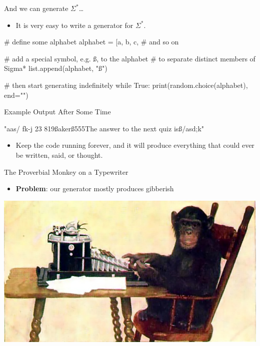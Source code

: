 \documentclass[professionalfonts, xcolor={usenames,svgnames,x11names,table}]{beamer}
\begin{document}
\begin{frame}[fragile]{And we can generate $\Sigma^*$\ldots}
    \begin{itemize}
        \item It is very easy to write a generator for $\Sigma^*$.
    \end{itemize}
\begin{pythoncode}
    # define some alphabet
    alphabet = [a, b, c, # and so on

    # add a special symbol, e.g. ß, to the alphabet
    # to separate distinct members of Sigma*
    list.append(alphabet, "ß")

    # then start generating indefinitely
    while True:
        print(random.choice(alphabet), end="")
\end{pythoncode}

\pause
\begin{exampleblock}{Example Output After Some Time}
\begin{pythoncode}
    "aas/ fk-j 23 819ßakerß555The answer to the next quiz isß/asd;k"
\end{pythoncode}
\end{exampleblock}

\pause
    \begin{itemize}
        \item Keep the code running forever, and it will produce everything that could ever be written, said, or thought.
    \end{itemize}
\end{frame}

\begin{frame}{The Proverbial Monkey on a Typewriter}
    \begin{itemize}
        \item \textbf{Problem}: our generator mostly produces gibberish
    \end{itemize}
    \begin{center}
        \includegraphics[width=.95\linewidth]{./img/monkey_typewriter}

    \end{center}
\end{frame}
\end{document}
